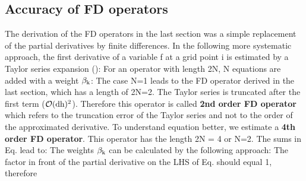 \subsection{Accuracy of FD operators}
The derivation of the FD operators in the last section was a simple replacement of the partial derivatives by finite differences. In the following more systematic approach, the first derivative of a variable f at a grid point i is estimated by a Taylor series expansion (\cite{jastram:92a}):
For an operator with length 2N, N equations are added with a weight $\rm{\beta_k}$:
The case N=1 leads to the FD operator derived in the last section, which has a length of 2N=2. The Taylor series is truncated after the first term ($\rm{{\mathcal{O}}(dh)^{2}}$). 
Therefore this operator is called {\bf{2nd order FD operator}} which refers to the truncation error of the Taylor series and not to the order of the approximated derivative.
To understand equation  better, we estimate a {\bf{4th order FD operator}}. This operator has the length 2N = 4 or N=2. The sums in Eq.  lead to:
The weights $\rm{\beta_k}$ can be calculated by the following approach: 
The factor in front of the partial derivative on the LHS of Eq.  should equal 1, therefore
